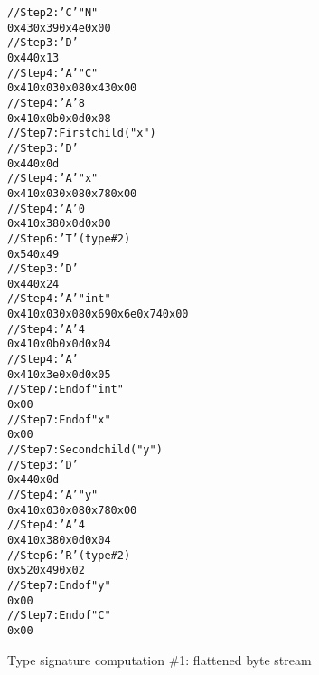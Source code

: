 \begin{figure}
\begin{dwflisting}
\begin{alltt}
// Step 2: 'C'  "N"
0x43 0x39 0x4e 0x00
// Step 3: 'D' 
0x44 0x13
// Step 4: 'A'   "C"
0x41 0x03 0x08 0x43 0x00
// Step 4: 'A'   8
0x41 0x0b 0x0d 0x08
// Step 7: First child ("x")
    // Step 3: 'D' 
    0x44 0x0d
    // Step 4: 'A'   "x"
    0x41 0x03 0x08 0x78 0x00
    // Step 4: 'A'   0
    0x41 0x38 0x0d 0x00
    // Step 6: 'T'  (type \#2)
    0x54 0x49
        // Step 3: 'D' 
        0x44 0x24
        // Step 4: 'A'   "int"
        0x41 0x03 0x08 0x69 0x6e 0x74 0x00
        // Step 4: 'A'   4
        0x41 0x0b 0x0d 0x04
        // Step 4: 'A'   
        0x41 0x3e 0x0d 0x05
        // Step 7: End of  "int"
        0x00
    // Step 7: End of  "x"
    0x00
// Step 7: Second child ("y")
    // Step 3: 'D' 
    0x44 0x0d
    // Step 4: 'A'   "y"
    0x41 0x03 0x08 0x78 0x00
    // Step 4: 'A'   4
    0x41 0x38 0x0d 0x04
    // Step 6: 'R'  (type \#2)
    0x52 0x49 0x02
    // Step 7: End of  "y"
    0x00
// Step 7: End of  "C"
0x00
\end{alltt}
\end{dwflisting}
\caption{Type signature computation \#1: flattened byte stream}
\label{fig:typesignaturecomputation1flattenedbytestream}
\end{figure}

